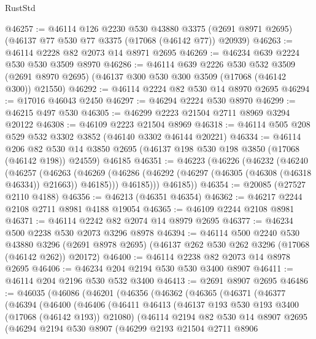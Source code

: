 \begin{lexlean}{RustStd}
\begin{coremodule}
@46257 := @46114
    @126
    @2230
    @530
    @43880
    @3375
    (@2691 @8971 @2695)
    (@46137 @77 @530 @77 @3375 (@17068 (@46142 @77)) @20939)
@46263 := @46114 @2228 @82 @2073 @14 @8971 @2695
@46269 := @46234 @639 @2224 @530 @530 @3509 @8970
@46286 := @46114
    @639
    @2226
    @530
    @532
    @3509
    (@2691 @8970 @2695)
    (@46137 @300 @530 @300 @3509 (@17068 (@46142 @300)) @21550)
@46292 := @46114 @2224 @82 @530 @14 @8970 @2695
@46294 := @17016 @46043 @2450
@46297 := @46294 @2224 @530 @8970
@46299 := @46215 @497 @530
@46305 := @46299 @2223 @21504 @2711 @8969 @3294 @20122
@46308 := @46109 @2223 @21504 @8969
@46318 := @46114 @505 @208 @529 @532 @3302 @3852 (@46140 @3302 @46144 @20221)
@46334 := @46114
    @206
    @82
    @530
    @14
    @3850
    @2695
    (@46137 @198 @530 @198 @3850 (@17068 (@46142 @198)) @24559)
    @46185
@46351 := @46223
    (@46226
      (@46232
        (@46240
          (@46257
            (@46263
              (@46269 (@46286 (@46292 (@46297 (@46305 (@46308 (@46318 @46334)) @21663)) @46185)))
              @46185)))
        @46185))
@46354 := @20085 (@27527 @2110 @4188)
@46356 := @46213 (@46351 @46354)
@46362 := @46217 @2244 @2108 @2711 @8981 @4188 @19054
@46365 := @46109 @2244 @2108 @8981
@46371 := @46114 @2242 @82 @2074 @14 @8979 @2695
@46377 := @46234 @500 @2238 @530 @2073 @3296 @8978
@46394 := @46114
    @500
    @2240
    @530
    @43880
    @3296
    (@2691 @8978 @2695)
    (@46137 @262 @530 @262 @3296 (@17068 (@46142 @262)) @20172)
@46400 := @46114 @2238 @82 @2073 @14 @8978 @2695
@46406 := @46234 @204 @2194 @530 @530 @3400 @8907
@46411 := @46114 @204 @2196 @530 @532 @3400
@46413 := @2691 @8907 @2695
@46486 := @46035
    (@46086
      (@46201
        (@46356
          (@46362
            (@46365
              (@46371
                (@46377
                  (@46394
                    (@46400
                      (@46406
                        (@46411
                          @46413
                          (@46137 @193 @530 @193 @3400 (@17068 (@46142 @193)) @21080)
                          (@46114
                            @2194
                            @82
                            @530
                            @14
                            @8907
                            @2695
                            (@46294
                              @2194
                              @530
                              @8907
                              (@46299
                                @2193
                                @21504
                                @2711
                                @8906

\end{coremodule}
\end{lexlean}
